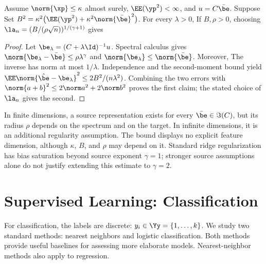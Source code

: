 \begin{thm}
Assume $\norm{\xp}\leq\kappa$ almost surely, $\EE(\yp^2)<\infty$, and $u=C\bar\be$. Suppose
Set $B^2=\kappa^2\bigl(\EE(\yp^2)+\kappa^2\norm{\bar\be}^2\bigr)$. For every $\lambda>0$,
If $B,\rho>0$, choosing $\la_n=(B/(\rho\sqrt n))^{1/(\gamma+1)}$ gives
\end{thm}
\begin{proof}
Let $\be_\lambda=(C+\lambda\Id)^{-1}u$. Spectral calculus gives
$\norm{\be_\lambda-\bar\be}\leq\rho\lambda^\gamma$ and $\norm{\be_\lambda}\leq\norm{\bar\be}$. Moreover,
The inverse has norm at most $1/\lambda$. Independence and the second-moment bound yield
$\EE\norm{\hat\be-\be_\lambda}^2\leq2B^2/(n\lambda^2)$. Combining the two errors with $\norm{a+b}^2\leq2\norm a^2+2\norm b^2$ proves the first claim; the stated choice of $\la_n$ gives the second.
\end{proof}

In finite dimensions, a source representation exists for every $\bar\be\in\Im(C)$, but its radius $\rho$ depends on the spectrum and on the target. In infinite dimensions, it is an additional regularity assumption. The bound displays no explicit feature dimension, although $\kappa$, $B$, and $\rho$ may depend on it. Standard ridge regularization has bias saturation beyond source exponent $\gamma=1$; stronger source assumptions alone do not justify extending this estimate to $\gamma=2$.

\section{Supervised Learning: Classification}
\label{sec-classif}

For classification, the labels are discrete: $y_i \in \Yy = \{1,\ldots,k\}$.
%
We study two standard methods: nearest neighbors and logistic classification.
%
Both methods provide useful baselines for assessing more elaborate models.
%
Nearest-neighbor methods also apply to regression.

